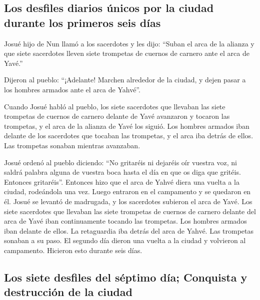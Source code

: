 \begin{paracol}{2}
\hypertarget{los-desfiles-diarios-uxfanicos-por-la-ciudad-durante-los-primeros-seis-duxedas}{%
\subsection{Los desfiles diarios únicos por la ciudad durante los
primeros seis
días}\label{los-desfiles-diarios-uxfanicos-por-la-ciudad-durante-los-primeros-seis-duxedas}}

 Josué hijo de Nun llamó a los sacerdotes y les dijo:
``Suban el arca de la alianza y que siete sacerdotes lleven siete
trompetas de cuernos de carnero ante el arca de Yavé.''

 Dijeron al pueblo: ``¡Adelante! Marchen alrededor de la
ciudad, y dejen pasar a los hombres armados ante el arca de Yahvé''.

 Cuando Josué habló al pueblo, los siete sacerdotes que
llevaban las siete trompetas de cuernos de carnero delante de Yavé
avanzaron y tocaron las trompetas, y el arca de la alianza de Yavé los
siguió.  Los hombres armados iban delante de los
sacerdotes que tocaban las trompetas, y el arca iba detrás de ellos. Las
trompetas sonaban mientras avanzaban.

 Josué ordenó al pueblo diciendo: ``No gritaréis ni
dejaréis oír vuestra voz, ni saldrá palabra alguna de vuestra boca hasta
el día en que os diga que gritéis. Entonces gritaréis''. 
Entonces hizo que el arca de Yahvé diera una vuelta a la ciudad,
rodeándola una vez. Luego entraron en el campamento y se quedaron en él.
 Josué se levantó de madrugada, y los sacerdotes subieron
el arca de Yavé.  Los siete sacerdotes que llevaban las
siete trompetas de cuernos de carnero delante del arca de Yavé iban
continuamente tocando las trompetas. Los hombres armados iban delante de
ellos. La retaguardia iba detrás del arca de Yahvé. Las trompetas
sonaban a su paso.  El segundo día dieron una vuelta a la
ciudad y volvieron al campamento. Hicieron esto durante seis días.

\hypertarget{los-siete-desfiles-del-suxe9ptimo-duxeda-conquista-y-destrucciuxf3n-de-la-ciudad}{%
\subsection{Los siete desfiles del séptimo día; Conquista y destrucción
de la
ciudad}\label{los-siete-desfiles-del-suxe9ptimo-duxeda-conquista-y-destrucciuxf3n-de-la-ciudad}}


\end{paracol}
